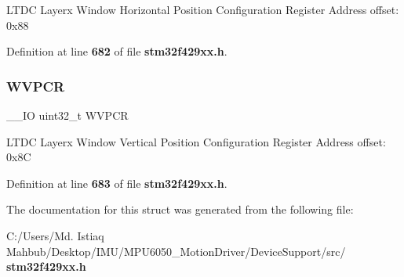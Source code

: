 L\+T\+DC Layerx Window Horizontal Position Configuration Register Address offset\+: 0x88 

Definition at line \textbf{ 682} of file \textbf{ stm32f429xx.\+h}.

\mbox{\label{structLTDC__Layer__TypeDef_aafd5aea090b8ab4f7cbaee88503cb6a1}} 
\subsubsection{W\+V\+P\+CR}
{\footnotesize\ttfamily \+\_\+\+\_\+\+IO uint32\+\_\+t W\+V\+P\+CR}

L\+T\+DC Layerx Window Vertical Position Configuration Register Address offset\+: 0x8C 

Definition at line \textbf{ 683} of file \textbf{ stm32f429xx.\+h}.



The documentation for this struct was generated from the following file\+:\begin{DoxyCompactItemize}
\item 
C\+:/\+Users/\+Md. Istiaq Mahbub/\+Desktop/\+I\+M\+U/\+M\+P\+U6050\+\_\+\+Motion\+Driver/\+Device\+Support/src/\textbf{ stm32f429xx.\+h}\end{DoxyCompactItemize}
